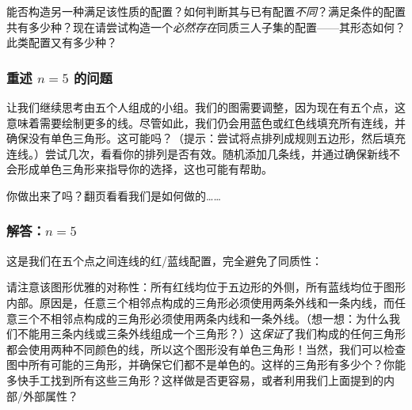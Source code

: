 能否构造另一种满足该性质的配置？如何判断其与已有配置\emph{不同}？满足条件的配置共有多少种？现在请尝试构造一个\emph{必然存在}同质三人子集的配置——其形态如何？此类配置又有多少种？

\subsubsection*{重述 $n = 5$ 的问题}

让我们继续思考由五个人组成的小组。我们的图需要调整，因为现在有五个点，这意味着需要绘制更多的线。尽管如此，我们仍会用蓝色或红色线填充所有连线，并确保没有单色三角形。这可能吗？（提示：尝试将点排列成规则五边形，然后填充连线。）尝试几次，看看你的排列是否有效。随机添加几条线，并通过确保新线不会形成单色三角形来指导你的选择，这也可能有帮助。

你做出来了吗？翻页看看我们是如何做的……

\clearpage

\subsubsection*{解答：$n=5$}

这是我们在五个点之间连线的红/蓝线配置，完全避免了同质性：

\begin{center}
\end{center}

请注意该图形优雅的对称性：所有红线均位于五边形的外侧，所有蓝线均位于图形内部。原因是，任意三个相邻点构成的三角形必须使用两条外线和一条内线，而任意三个不相邻点构成的三角形必须使用两条内线和一条外线。（想一想：为什么我们不能用三条内线或三条外线组成一个三角形？）这\emph{保证}了我们构成的任何三角形都会使用两种不同颜色的线，所以这个图形没有单色三角形！当然，我们可以检查图中所有可能的三角形，并确保它们都不是单色的。这样的三角形有多少个？你能多快手工找到所有这些三角形？这样做是否更容易，或者利用我们上面提到的内部/外部属性？


